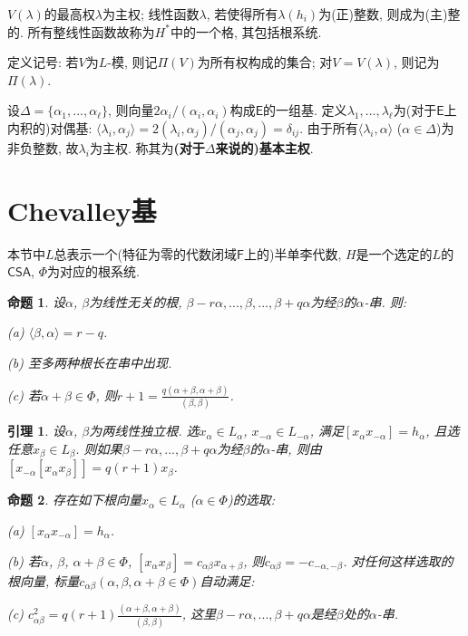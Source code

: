 \documentclass{ctexart}%
\newtheorem{lemma}{引理}
\newtheorem{proposition}{命题}
\theoremstyle{definition}
\theoremstyle{remark}
\begin{document}
$V(\lambda)$的最高权$\lambda$为主权; 线性函数$\lambda$, 若使得所有$\lambda(h_i)$为(正)整数, 则成为(主)整的. 所有整线性函数故称为$H^*$中的一个格, 其包括根系统. 

定义记号: 若$V$为$L$-模, 则记$\Pi(V)$为所有权构成的集合; 对$V=V(\lambda)$, 则记为$\Pi(\lambda)$.


设$\Delta=\{\alpha_1,...,\alpha_\ell\}$, 则向量$2\alpha_i/(\alpha_i,\alpha_i)$构成$\mathsf{E}$的一组基. 定义$\lambda_1,...,\lambda_\ell$为(对于$\mathsf{E}$上内积的)对偶基: $\langle \lambda_i,\alpha_j\rangle = 2(\lambda_i,\alpha_j)/(\alpha_j,\alpha_j)=\delta_{ij}$. 由于所有$\langle \lambda_i,\alpha\rangle$ ($\alpha\in\Delta$)为非负整数, 故$\lambda_i$为主权. 称其为\textbf{(对于$\Delta$来说的)基本主权}.

\section{Chevalley基}

本节中$L$总表示一个(特征为零的代数闭域$\mathsf{F}$上的)半单李代数, $H$是一个选定的$L$的$\mathsf{CSA}$, $\Phi$为对应的根系统.

\begin{proposition} 设$\alpha$, $\beta$为线性无关的根, $\beta-r\alpha,...,\beta,...,\beta+q\alpha$为经$\beta$的$\alpha$-串. 则:

(a) $\langle\beta,\alpha\rangle=r-q$.

(b) 至多两种根长在串中出现.

(c) 若$\alpha+\beta\in \Phi$, 则$r+1=\frac{q(\alpha+\beta,\alpha+\beta)}{(\beta,\beta)}$.
\end{proposition}


\begin{lemma} 设$\alpha$, $\beta$为两线性独立根. 选$x_\alpha \in L_\alpha$, $x_{-\alpha}\in L_{-\alpha}$, 满足$[x_\alpha x_{-\alpha}] = h_\alpha$, 且选任意$x_\beta\in L_\beta$. 则如果$\beta-r\alpha,...,\beta+q\alpha$为经$\beta$的$\alpha$-串, 则由$[x_{-\alpha}[x_\alpha x_\beta]]=q(r+1)x_\beta$.
\end{lemma}

\begin{proposition}\label{25.2} 存在如下根向量$x_\alpha \in L_\alpha$ ($\alpha\in \Phi$)的选取:

(a) $[x_\alpha x_{-\alpha}] = h_\alpha$.

(b) 若$\alpha$, $\beta$, $\alpha+\beta\in\Phi$, $[x_\alpha x_\beta]=c_{\alpha\beta}x_{\alpha+\beta}$, 则$c_{\alpha\beta}=-c_{-\alpha,-\beta}$. 对任何这样选取的根向量, 标量$c_{\alpha\beta}(\alpha,\beta,\alpha+\beta \in\Phi)$自动满足:

(c) $c^2_{\alpha\beta} = q(r+1)\frac{(\alpha+\beta,\alpha+\beta)}{(\beta,\beta)}$, 这里$\beta-r\alpha,...,\beta+q\alpha$是经$\beta$处的$\alpha$-串.
\end{proposition}
\end{document}
